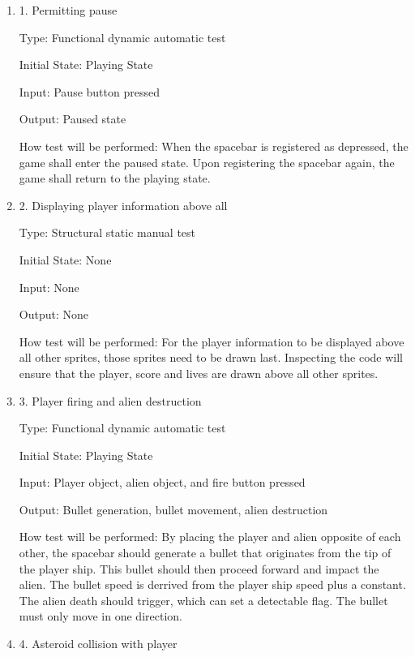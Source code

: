 \documentclass[12pt, titlepage]{article}
\begin{document}
\begin{enumerate}

\item{1. Permitting pause\\}

Type: Functional dynamic automatic test

Initial State: Playing State

Input: Pause button pressed

Output: Paused state

How test will be performed: When the spacebar is registered as depressed, the game shall enter the paused state. Upon registering the spacebar again, the game shall return to the playing state.

\item{2. Displaying player information above all\\}

Type: Structural static manual test

Initial State: None

Input: None

Output: None

How test will be performed: For the player information to be displayed above all other sprites, those sprites need to be drawn last. Inspecting the code will ensure that the player, score and lives are drawn above all other sprites.

\item{3. Player firing and alien destruction\\}

Type: Functional dynamic automatic test

Initial State: Playing State

Input: Player object, alien object, and fire button pressed

Output: Bullet generation, bullet movement, alien destruction

How test will be performed: By placing the player and alien opposite of each other, the spacebar should generate a bullet that originates from the tip of the player ship. This bullet should then proceed forward and impact the alien. The bullet speed is derrived from the player ship speed plus a constant. The alien death should trigger, which can set a detectable flag. The bullet must only move in one direction.

\item{4. Asteroid collision with player\\}


\end{enumerate}
\end{document}
